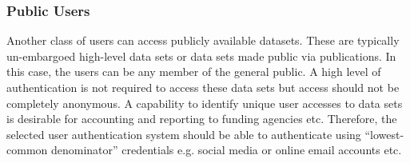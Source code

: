 \documentclass[12pt,a4paper]{article}
\begin{document}
\subsubsection{Public Users} \label{ssec:public}

Another class of users can access publicly available datasets.
These are typically un-embargoed high-level data sets or data sets made public via publications.
In this case, the users can be any member of the general public.
A high level of authentication is not required to access these data sets but access should not be completely anonymous.
A capability to identify unique user accesses to data sets is desirable for accounting and reporting to funding agencies etc.
Therefore, the selected user authentication system should be able to authenticate using ``lowest-common denominator'' credentials e.g. social media or online email accounts etc.

% 



\newpage
{}

\end{document}
